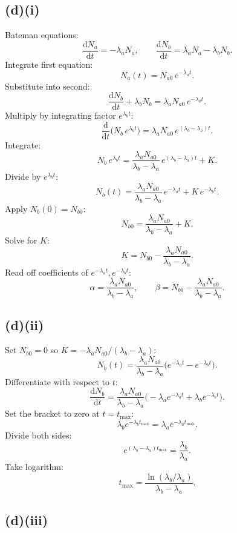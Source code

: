 \documentclass[11pt]{article}
\newcommand{\de}{\mathrm{d}}
\begin{document}
\subsection*{(d)(i)}

Bateman equations:
\[ \frac{\de N_a}{\de t} = -\lambda_a N_a,\qquad \frac{\de N_b}{\de t} = \lambda_a N_a - \lambda_b N_b. \]
Integrate first equation:
\[ N_a(t) = N_{a0}\,e^{-\lambda_a t}. \]
Substitute into second:
\[ \frac{\de N_b}{\de t} + \lambda_b N_b = \lambda_a N_{a0}\,e^{-\lambda_a t}. \]
Multiply by integrating factor $e^{\lambda_b t}$:
\[ \frac{\de}{\de t}\bigl(N_b\,e^{\lambda_b t}\bigr) = \lambda_a N_{a0}\,e^{(\lambda_b - \lambda_a)t}. \]
Integrate:
\[ N_b\,e^{\lambda_b t} = \frac{\lambda_a N_{a0}}{\lambda_b - \lambda_a}\,e^{(\lambda_b-\lambda_a) t} + K. \]
Divide by $e^{\lambda_b t}$:
\[ N_b(t) = \frac{\lambda_a N_{a0}}{\lambda_b - \lambda_a}\,e^{-\lambda_a t} + K\,e^{-\lambda_b t}. \]
Apply $N_b(0)=N_{b0}$:
\[ N_{b0} = \frac{\lambda_a N_{a0}}{\lambda_b - \lambda_a} + K. \]
Solve for $K$:
\[ K = N_{b0} - \frac{\lambda_a N_{a0}}{\lambda_b - \lambda_a}. \]
Read off coefficients of $e^{-\lambda_a t}, e^{-\lambda_b t}$:
\[ \boxed{\;\alpha = \frac{\lambda_a N_{a0}}{\lambda_b - \lambda_a},\qquad \beta = N_{b0} - \frac{\lambda_a N_{a0}}{\lambda_b-\lambda_a}.\;} \]

\subsection*{(d)(ii)}

Set $N_{b0}=0$ so $K = -\lambda_a N_{a0}/(\lambda_b-\lambda_a)$:
\[ N_b(t) = \frac{\lambda_a N_{a0}}{\lambda_b - \lambda_a}\bigl(e^{-\lambda_a t} - e^{-\lambda_b t}\bigr). \]
Differentiate with respect to $t$:
\[ \frac{\de N_b}{\de t} = \frac{\lambda_a N_{a0}}{\lambda_b - \lambda_a}\bigl(-\lambda_a e^{-\lambda_a t} + \lambda_b e^{-\lambda_b t}\bigr). \]
Set the bracket to zero at $t=t_{\max}$:
\[ \lambda_b e^{-\lambda_b t_{\max}} = \lambda_a e^{-\lambda_a t_{\max}}. \]
Divide both sides:
\[ e^{(\lambda_b - \lambda_a) t_{\max}} = \frac{\lambda_b}{\lambda_a}. \]
Take logarithm:
\[ \boxed{\;t_{\max} = \frac{\ln(\lambda_b/\lambda_a)}{\lambda_b - \lambda_a}.\;} \]

\subsection*{(d)(iii)}
\end{document}

